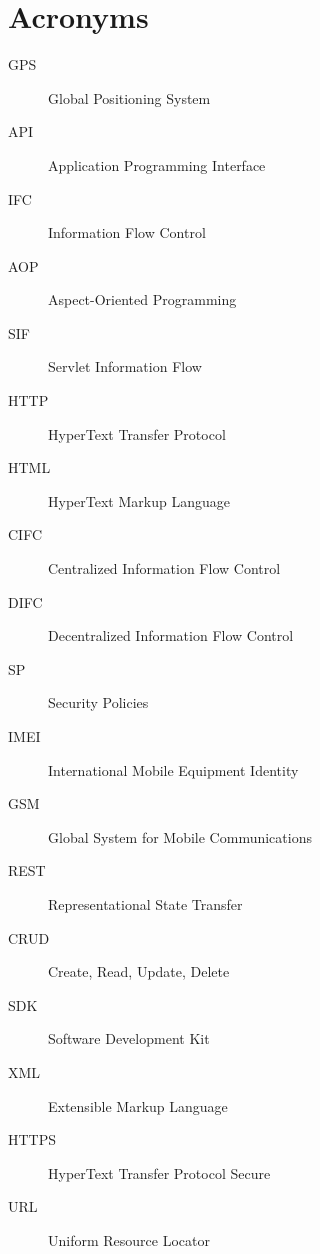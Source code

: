 
\chapter*{Acronyms}

\begin{singlespace}

\begin{description}

\item[GPS]{Global Positioning System}

\item[API]{Application Programming Interface}

\item[IFC]{Information Flow Control}

\item[AOP]{Aspect-Oriented Programming}

\item[SIF]{Servlet Information Flow}

\item[HTTP]{HyperText Transfer Protocol}

\item[HTML]{HyperText Markup Language}

\item[CIFC]{Centralized Information Flow Control}

\item[DIFC]{Decentralized Information Flow Control}

\item[SP]{Security Policies}

\item[IMEI]{International Mobile Equipment Identity}

\item[GSM]{Global System for Mobile Communications}

\item[REST]{Representational State Transfer}

\item[CRUD]{Create, Read, Update, Delete}

\item[SDK]{Software Development Kit}

\item[XML]{Extensible Markup Language}

\item[HTTPS]{HyperText Transfer Protocol Secure}

\item[URL]{Uniform Resource Locator}


\end{description}
\end{singlespace}
